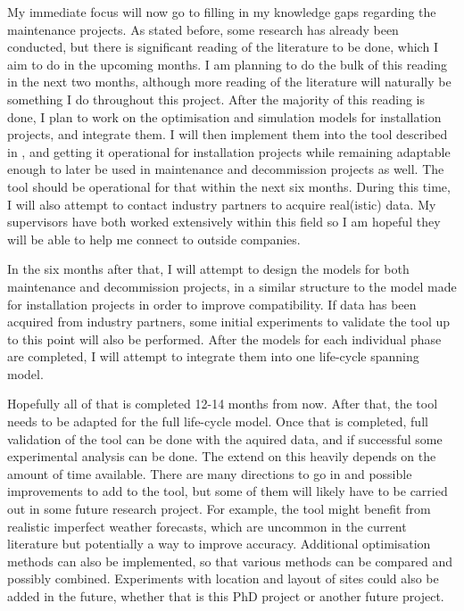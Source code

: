 \documentclass[a4paper,12pt]{article}
\begin{document}
\bigskip

My immediate focus will now go to filling in my knowledge gaps regarding the maintenance projects. As stated before, some research has already been conducted, but there is significant reading of the literature to be done, which I aim to do in the upcoming months. I am planning to do the bulk of this reading in the next two months, although more reading of the literature will naturally be something I do throughout this project. After the majority of this reading is done, I plan to work on the optimisation and simulation models for installation projects, and integrate them. I will then implement them into the tool described in , and getting it operational for installation projects while remaining adaptable enough to later be used in maintenance and decommission projects as well. The tool should be operational for that within the next six months. During this time, I will also attempt to contact industry partners to acquire real(istic) data. My supervisors have both worked extensively within this field so I am hopeful they will be able to help me connect to outside companies.

In the six months after that, I will attempt to design the models for both maintenance and decommission projects, in a similar structure to the model made for installation projects in order to improve compatibility. If data has been acquired from industry partners, some initial experiments to validate the tool up to this point will also be performed. After the models for each individual phase are completed, I will attempt to integrate them into one life-cycle spanning model. 

Hopefully all of that is completed 12-14 months from now. After that, the tool needs to be adapted for the full life-cycle model. Once that is completed, full validation of the tool can be done with the aquired data, and if successful some experimental analysis can be done. The extend on this heavily depends on the amount of time available. There are many directions to go in and possible improvements to add to the tool, but some of them will likely have to be carried out in some future research project. For example, the tool might benefit from realistic imperfect weather forecasts, which are uncommon in the current literature but potentially a way to improve accuracy. Additional optimisation methods can also be implemented, so that various methods can be compared and possibly combined. Experiments with location and layout of sites could also be added in the future, whether that is this PhD project or another future project. 
\end{document}
